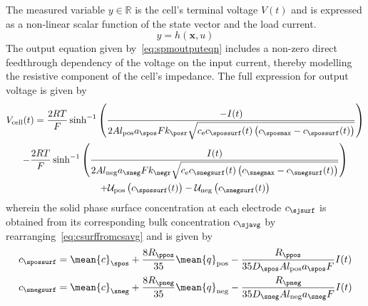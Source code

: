 The measured variable $y ∈ \mathbb{R}$ is the cell's terminal voltage
$V(t)$ and is expressed as a non-linear  scalar function of the state vector and
the load current.
\begin{equation}\label{eq:spmoutputeqn}
    y = h(\mathbf{x},u)
\end{equation}
The output  equation given by~\cref{eq:spmoutputeqn} includes  a non-zero direct
feedthrough dependency  of the voltage  on the input current,  thereby modelling
the resistive component of the cell's  impedance. The full expression for output
voltage is given by
\begin{multline}
    V_\text{cell}(t) = \frac{2 R T}{F }\sinh^{-1} \left( \frac{- I(t)}{2 A
    l_\text{pos} a_\spos F k_\posr \sqrt{c_\text{e} c_\spossurf(t)
    \left(c_\sposmax - c_\spossurf(t)\right)}}\right) \\
    - \frac{2 R T}{F }\sinh^{-1} \left( \frac{I(t)}{2 A l_\text{neg} a_\sneg F
    k_\negr \sqrt{c_\text{e} c_\snegsurf(t) \left(c_\snegmax - c_\snegsurf(t)\right)}}\right) \\
    + \mathcal{U}_\text{pos}\left(c_\spossurf(t)\right) -
    \mathcal{U}_\text{neg}\left(c_\snegsurf(t)\right)
\end{multline}
wherein  the solid  phase surface  concentration at  each electrode  $c_\sjsurf$
is   obtained  from   its   corresponding  bulk   concentration  $c_\sjavg$   by
rearranging~\cref{eq:csurffromcsavg} and is given by
\begin{align}
    c_\spossurf &= \mean{c}_\spos  + \frac{8R_\ppos}{35} \mean{q}_\text{pos} -\frac{R_\ppos}{35 D_\spos A l_\text{pos} a_\spos F} I(t) \\
    c_\snegsurf &= \mean{c}_\sneg  + \frac{8R_\pneg}{35} \mean{q}_\text{neg} -\frac{R_\pneg}{35 D_\sneg A l_\text{neg} a_\sneg F} I(t)
\end{align}



